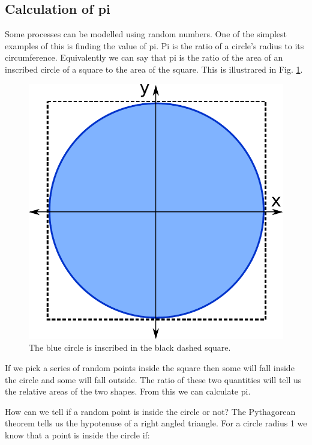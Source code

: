 	\subsection{Calculation of pi}\label{pi_exercise}
		Some processes can be modelled using random numbers. One of the simplest examples of this is finding the value of pi. Pi is the ratio of a circle's radius to its circumference. Equivalently we can say that pi is the ratio of the area of an inscribed circle of a square to the area of the square. This is illustrared in Fig. \ref{fig:picircle}. 
	\begin{figure}[h]
		\centering
		\includegraphics[scale=0.4]{images/pi}
		\caption{The blue circle is inscribed in the black dashed square.}
		\label{fig:picircle}
	\end{figure}

	If we pick a series of random points inside the square then some will fall inside the circle and some will fall outside. The ratio of these two quantities will tell us the relative areas of the two shapes. From this we can calculate pi.

	How can we tell if a random point is inside the circle or not? The Pythagorean theorem tells us the hypotenuse of a right angled triangle. For a circle radius 1 we know that a point is inside the circle if:

